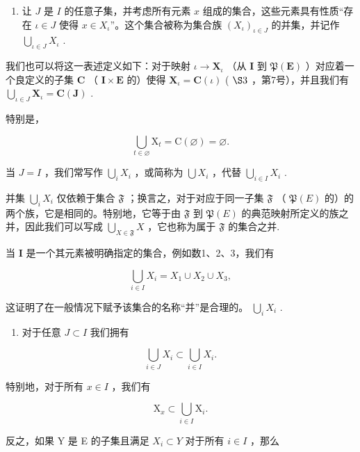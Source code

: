 \begin{enumerate}
\def\labelenumi{\arabic{enumi}.}
\setcounter{enumi}{1}
\tightlist
\item
  让 \(J\) 是 \(I\) 的任意子集，并考虑所有元素 \(x\) 组成的集合，这些元素具有性质“存在 \(\iota \in J\) 使得 \(x \in X_\iota\)''。这个集合被称为集合族 \((X_\iota)_{\iota \in J}\) 的并集，并记作 \(\bigcup_{\iota\in J} X_\iota\) .
\end{enumerate}

我们也可以将这一表述定义如下：对于映射 \(\iota \to \mathbf{X}_{\iota}\) （从 \(\mathbf{I}\) 到 \(\mathfrak{P}(\mathbf{E})\) ）对应着一个良定义的子集 \(\mathbf{C}\) （ \(\mathbf{I} \times \mathbf{E}\) 的）使得 \(\mathbf{X}_{\iota} = \mathbf{C}(\iota)\) ( \(\S 3\) ，第7号），并且我们有 \(\bigcup_{\iota \in J} \mathbf{X}_{\iota} = \mathbf{C}(\mathbf{J})\) .

特别是，

\[
\bigcup_ {t \in \varnothing} \mathrm{X} _ {t} = \mathrm{C} (\varnothing) = \varnothing .\tag{33}
\]

当 \(J = I\) ，我们常写作 \(\bigcup_{i} X_i\) ，或简称为 \(\bigcup X_i\) ，代替 \(\bigcup_{i \in I} X_i\) .

并集 \(\bigcup_{i} X_{i}\) 仅依赖于集合 \(\mathfrak{F}\) ；换言之，对于对应于同一子集 \(\mathfrak{F}\) （ \(\mathfrak{P}(E)\) 的）的两个族，它是相同的。特别地，它等于由 \(\mathfrak{F}\) 到 \(\mathfrak{P}(E)\) 的典范映射所定义的族之并，因此我们可以写成 \(\bigcup_{X \in \mathfrak{F}} X\) ，它也称为属于 \(\mathfrak{F}\) 的集合之并.

当 \(\mathbf{I}\) 是一个其元素被明确指定的集合，例如数1、2、3，我们有

\[
\bigcup_ {i \in I} X _ {i} = X _ {1} \cup X _ {2} \cup X _ {3},
\]

这证明了在一般情况下赋予该集合的名称“并”是合理的。 \(\bigcup_{i}X_{i}\) .

\begin{enumerate}
\def\labelenumi{\arabic{enumi}.}
\setcounter{enumi}{2}
\tightlist
\item
  对于任意 \(J \subset I\) 我们拥有
\end{enumerate}

\[
\bigcup_ {i \in J} X _ {i} \subset \bigcup_ {i \in I} X _ {i}.
\]

特别地，对于所有 \(x \in I\) ，我们有

\[
\mathrm{X} _ {x} \subset \bigcup_ {i \in I} \mathrm{X} _ {i}.
\]

反之，如果 Y 是 E 的子集且满足 \(X_{i} \subset Y\) 对于所有 \(i \in I\) ，那么

